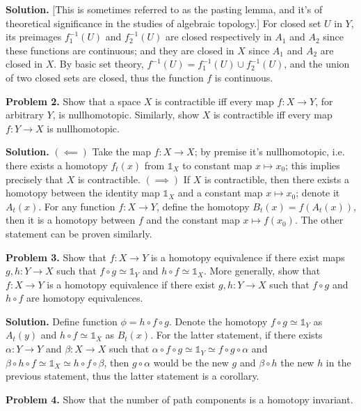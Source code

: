 \documentclass[10pt]{article}
\begin{document}
\begin{CJK*}{UTF8}{gbsn}
\textbf{Solution.} [This is sometimes referred to as the pasting lemma, and it's of theoretical significance in the studies of algebraic topology.] For closed set $U$ in $Y$, its preimages $f_1^{-1}(U)$ and $f_2^{-1}(U)$ are closed respectively in $A_1$ and $A_2$ since these functions are continuous; and they are closed in $X$ since $A_1$ and $A_2$ are closed in $X$. By basic set theory, $f^{-1}(U)=f_1^{-1}(U)\cup f_2^{-1}(U)$, and the union of two closed sets are closed, thus the function $f$ is continuous.

\textbf{Problem 2.} Show that a space $X$ is contractible iff every map $f:X\to Y$, for arbitrary $Y$, is nullhomotopic. Similarly, show $X$ is contractible iff every map $f:Y\to X$ is nullhomotopic.

\textbf{Solution.} $(\impliedby)$ Take the map $f:X\to X$; by premise it's nullhomotopic, i.e. there exists a homotopy $f_t(x)$ from $\mathbb{1}_X$ to constant map $x\mapsto x_0$; this implies precisely that $X$ is contractible. $(\implies)$ If $X$ is contractible, then there exists a homotopy between the identity map $\mathbb{1}_X$ and a constant map $x\mapsto x_0$; denote it $A_t(x)$. For any function $f:X\to Y$, define the homotopy $B_t(x)=f(A_t(x))$, then it is a homotopy between $f$ and the constant map $x\mapsto f(x_0)$. The other statement can be proven similarly.

\textbf{Problem 3.} Show that $f:X\to Y$ is a homotopy equivalence if there exist maps $g,h:Y\to X$ such that $f\circ g\simeq\mathbb{1}_Y$ and $h\circ f\simeq\mathbb{1}_X$. More generally, show that $f:X\to Y$ is a homotopy equivalence if there exist $g,h:Y\to X$ such that $f\circ g$ and $h\circ f$ are homotopy equivalences.

\textbf{Solution.} Define function $\phi=h\circ f\circ g$. Denote the homotopy $f\circ g\simeq\mathbb{1}_Y$ as $A_t(y)$ and $h\circ f\simeq\mathbb{1}_X$ as $B_t(x)$. For the latter statement, if there exists $\alpha:Y\to Y$ and $\beta:X\to X$ such that $\alpha\circ f\circ g\simeq\mathbb{1}_Y\simeq f\circ g\circ\alpha$ and $\beta\circ h\circ f\simeq\mathbb{1}_X\simeq h\circ f\circ\beta$, then $g\circ\alpha$ would be the new $g$ and $\beta\circ h$ the new $h$ in the previous statement, thus the latter statement is a corollary.

\textbf{Problem 4.} Show that the number of path components is a homotopy invariant.


\end{CJK*}
\end{document}
